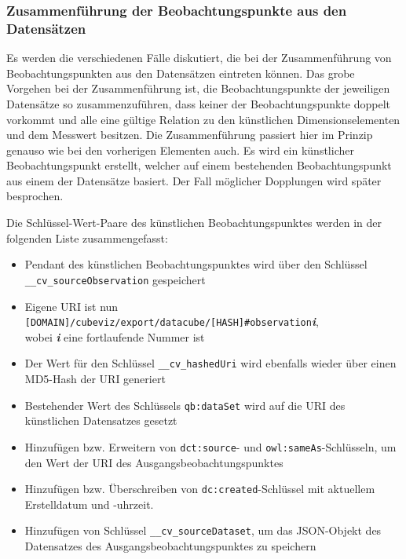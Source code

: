 \documentclass[11pt]{article}
\begin{document}
%
%
\subsubsection{Zusammenführung der Beobachtungspunkte aus den Datensätzen}

Es werden die verschiedenen Fälle diskutiert, die bei der Zusammenführung von Beobachtungspunkten aus den Datensätzen eintreten können. Das grobe Vorgehen bei der Zusammenführung ist, die Beobachtungspunkte der jeweiligen Datensätze so zusammenzuführen, dass keiner der Beobachtungspunkte doppelt vorkommt und alle eine gültige Relation zu den künstlichen Dimensionselementen und dem Messwert besitzen. Die Zusammenführung passiert hier im Prinzip genauso wie bei den vorherigen Elementen auch. Es wird ein künstlicher Beobachtungspunkt erstellt, welcher auf einem bestehenden Beobachtungspunkt aus einem der Datensätze basiert. Der Fall möglicher Dopplungen wird später besprochen. 

\newpage
\noindent
Die Schlüssel-Wert-Paare des künstlichen Beobachtungspunktes werden in der folgenden Liste zusammengefasst:

\begin{itemize}

    \item Pendant des künstlichen Beobachtungspunktes wird über den Schlüssel \\\verb|__cv_sourceObservation|  gespeichert

    \item Eigene URI ist nun \verb|[DOMAIN]/cubeviz/export/datacube/[HASH]|\verb|#observation|\textit{\textbf{i}},\\wobei \textit{\textbf{i}} eine fortlaufende Nummer ist
    
    \item Der Wert für den Schlüssel \verb|__cv_hashedUri| wird ebenfalls wieder über einen MD5-Hash der URI generiert
    
    \item Bestehender Wert des Schlüssels \verb|qb:dataSet| wird auf die URI des künstlichen Datensatzes gesetzt
    
    \item Hinzufügen bzw. Erweitern von \verb|dct:source|- und \verb|owl:sameAs|-Schlüsseln, um den Wert der URI des Ausgangsbeobachtungspunktes
    
    \item Hinzufügen bzw. Überschreiben von \verb|dc:created|-Schlüssel mit aktuellem Erstelldatum und -uhrzeit.
    
    \item Hinzufügen von Schlüssel \verb|__cv_sourceDataset|, um das JSON-Objekt des Datensatzes des Ausgangsbeobachtungspunktes zu speichern
    
\end{itemize}
\end{document}
